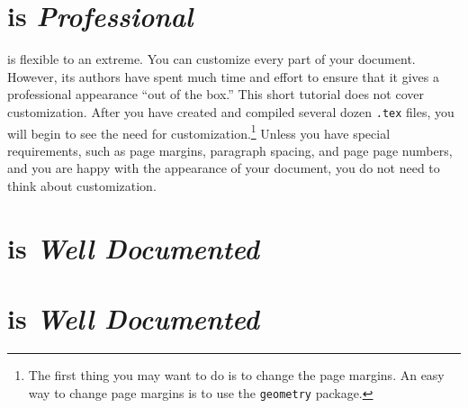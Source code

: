 \documentclass{article}
\begin{document}
    \section*{\LaTeXe{} is \textit{Professional}}

	\LaTeXe{} is flexible to an extreme. You can customize every part of your document. However, its authors have spent much time and effort to ensure that it gives a professional appearance ``out of the box.'' This short tutorial does not cover customization. After you have created and compiled several dozen \texttt{.tex} files, you will begin to see the need for customization.\footnote{The first thing you may want to do is to change the page margins. An easy way to change page margins is to use the \texttt{geometry} package.} Unless you have special requirements, such as page margins, paragraph spacing, and page page numbers, and you are happy with the appearance of your document, you do not need to think about customization.

	

    \section*{\LaTeXe{} is \textit{Well Documented}}

	

    \section*{\LaTeXe{} is \textit{Well Documented}}
\end{document}
